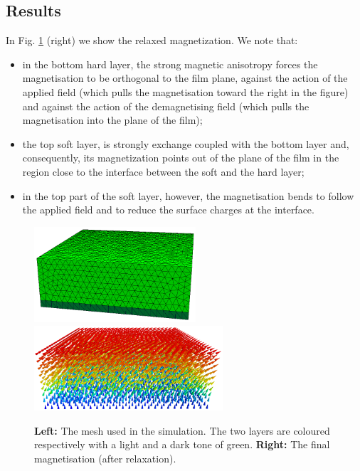 \documentclass[11pt,oneside,openany]{article}
\begin{document}
\subsection{Results}
In Fig. \ref{fig:results} (right) we show the relaxed magnetization.
We note that:
\begin{itemize}
\item in the bottom hard layer, the strong magnetic anisotropy forces
the magnetisation to be orthogonal to the film plane, against the action
of the applied field (which pulls the magnetisation toward the right in the
figure) and against the action of the demagnetising field (which pulls the
magnetisation into the plane of the film);
\item the top soft layer, is strongly exchange coupled with the bottom layer
and, consequently, its magnetization points out of the plane of the film
in the region close to the interface between the soft and the hard layer;
\item in the top part of the soft layer, however, the magnetisation bends
to follow the applied field and to reduce the surface charges at the
interface.
\end{itemize}

\begin{figure}[t]
\begin{center}
\includegraphics[width=6.0cm]{mesh}
\includegraphics[width=7.0cm]{m-final}
\caption[Sketch]{\textbf{Left:} The mesh used in the simulation.
  The two layers are coloured respectively with a light and a dark tone
  of green. \textbf{Right:} The final magnetisation (after relaxation).}
\label{fig:results}
\end{center}
\end{figure}
\end{document}
